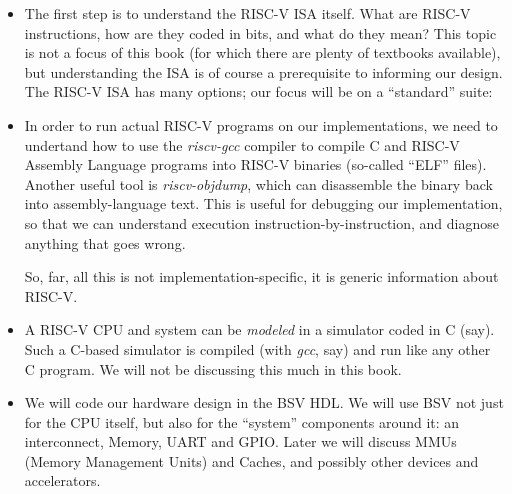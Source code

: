 \begin{itemize}

\item The first step is to understand the RISC-V ISA itself.  What are
    RISC-V instructions, how are they coded in bits, and what do they
    mean?  This topic is not a focus of this book (for which there are
    plenty of textbooks available), but understanding the ISA is of
    course a prerequisite to informing our design.  The RISC-V ISA has
    many options; our focus will be on a ``standard'' suite:



\item In order to run actual RISC-V programs on our implementations,
    we need to undertand how to use the \emph{riscv-gcc} compiler to
    compile C and RISC-V Assembly Language programs into RISC-V
    binaries (so-called ``ELF'' files).  Another useful tool is
    \emph{riscv-objdump}, which can disassemble the binary back into
    assembly-language text. This is useful for debugging our
    implementation, so that we can understand execution
    instruction-by-instruction, and diagnose anything that goes wrong.

    So, far, all this is not implementation-specific, {\ie} it is
    generic information about RISC-V.

\item A RISC-V CPU and system can be \emph{modeled} in a simulator
    coded in C (say).  Such a C-based simulator is compiled (with
    \emph{gcc}, say) and run like any other C program. We will not be
    discussing this much in this book.

\item We will code our hardware design in the BSV HDL.  We will use
    BSV not just for the CPU itself, but also for the ``system''
    components around it: an interconnect, Memory, UART and GPIO.
    Later we will discuss MMUs (Memory Management Units) and Caches,
    and possibly other devices and accelerators.


\end{itemize}
